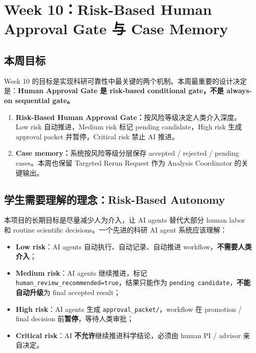 \documentclass[11pt,a4paper,fontset=none]{ctexart}
\begin{document}
\newpage

\section{Week 10：Risk-Based Human Approval Gate 与 Case Memory}

\subsection{本周目标}

Week 10 的目标是实现科研可靠性中最关键的两个机制。本周最重要的设计决定是：\textbf{Human Approval Gate 是 risk-based conditional gate，不是 always-on sequential gate。}

\begin{enumerate}[leftmargin=2em]
  \item \textbf{Risk-Based Human Approval Gate：}按风险等级决定人类介入深度。Low risk 自动推进，Medium risk 标记 pending candidate，High risk 生成 approval packet 并暂停，Critical risk 禁止 AI 推进。
  \item \textbf{Case memory：}系统按风险等级分层保存 accepted / rejected / pending cases。本周也保留 Targeted Rerun Request 作为 Analysis Coordinator 的关键输出。
\end{enumerate}

\subsection{学生需要理解的理念：Risk-Based Autonomy}

本项目的长期目标是尽量减少人为介入，让 AI agents 替代大部分 human labor 和 routine scientific decisions。一个先进的科研 AI agent 系统应该理解：

\begin{itemize}[leftmargin=2em]
  \item \textbf{Low risk}：AI agents 自动执行、自动记录、自动推进 workflow，\textbf{不需要人类介入}；
  \item \textbf{Medium risk}：AI agents 继续推进，标记 \texttt{human\_review\_recommended=true}，结果只能作为 \texttt{pending candidate}，\textbf{不能自动升级}为 final accepted result；
  \item \textbf{High risk}：AI agents 生成 \texttt{approval\_packet/}，workflow 在 promotion / final decision 前\textbf{暂停}，等待人类审批；
  \item \textbf{Critical risk}：AI \textbf{不允许}继续推进科学结论，必须由 human PI / advisor 亲自决定。
\end{itemize}
\end{document}
